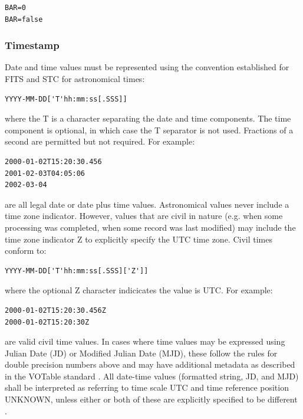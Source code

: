 \documentclass[11pt,letter]{ivoa}
\begin{document}
\begin{verbatim}
BAR=0
BAR=false
\end{verbatim}

\subsubsection{Timestamp}
Date and time values must be represented  using the convention established for 
FITS \citep{std:FITS} and STC \citep{std:STC} for astronomical times:

\begin{verbatim}
YYYY-MM-DD['T'hh:mm:ss[.SSS]]
\end{verbatim}

where the  T is a character separating the date and time components. The time 
component is optional, in which case the T separator is not used. Fractions of a 
second are permitted but not required. For example:

\begin{verbatim}
2000-01-02T15:20:30.456
2001-02-03T04:05:06
2002-03-04
\end{verbatim}

are all legal date or date plus time values. Astronomical values never 
include a time zone indicator. However, values that 
are civil in nature (e.g. when some processing was completed, when some record 
was last modified) may include the time zone indicator Z to explicitly specify 
the UTC time zone. Civil times conform to:

\begin{verbatim}
YYYY-MM-DD['T'hh:mm:ss[.SSS]['Z']]
\end{verbatim}

where the optional Z character indicicates the value is UTC. For example:

\begin{verbatim}
2000-01-02T15:20:30.456Z
2000-01-02T15:20:30Z
\end{verbatim}

are valid civil time values. In cases where time values may be 
expressed using Julian Date (JD) or Modified Julian Date (MJD), these follow the 
rules for double precision numbers above and may have additional metadata as 
described in the VOTable standard \citep{std:VOTABLE}. All date-time values (formatted string, JD, 
and MJD) shall be interpreted as referring to time scale UTC and time reference 
position UNKNOWN, unless either or both of these are explicitly specified to be 
different \citep{std:STC}. 
\end{document}

